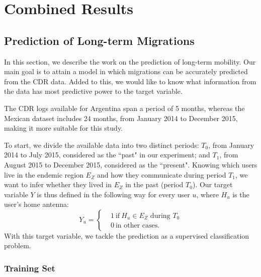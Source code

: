 
\chapter{Combined Results}\label{cha:evaluation-results}


\section{Prediction of Long-term Migrations} \label{long_term}

In this section, we describe the work on the prediction of long-term mobility. Our main goal is to attain a model in which migrations can be accurately predicted from the CDR data. Added to this, we would like to know what information from the data has most predictive power to the target variable.

The CDR logs available for Argentina span a period of 5 months, 
whereas the Mexican dataset includes 24 months, from January 2014 to December 2015, making it more suitable for this study.

To start, we divide the available data into two distinct periods:
$T_0$, from January 2014 to July 2015, considered as the ``past" in our experiment;
and $T_1$, from August 2015 to December 2015, considered as the ``present".
Knowing which users live in the endemic region $E_Z$ and how they communicate
during period $T_1$,
we want to infer whether they lived in $E_Z$ in the past (period $T_0$).
Our target variable $Y$ is thus defined in the following way for every user $u$,
where $H_u$ is the user's home antenna: 
\[
Y_u =
\begin{cases}
&1 \ \mbox{if} \ H_u \in E_Z \mbox{ during } T_0 \\
&0 \ \mbox{in other cases}.
\end{cases}
\]
With this target variable, we tackle the prediction as a supervised classification problem.


\subsection{Training Set}

